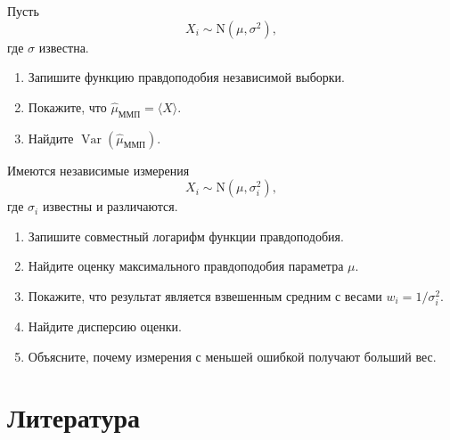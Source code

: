 \documentclass[
  russian,
  11pt,
  a4paper,
  open=any]{scrbook}
\providecommand{\tightlist}{%
  \setlength{\itemsep}{0pt}\setlength{\parskip}{0pt}}
\begin{document}
\begin{semanticpdfbox}[colback=BookCoralSoft,borderline west={1.2mm}{0pt}{BookCoral}]

\par\nopagebreak[4]\vspace{1.2mm}

Пусть \[
X_i\sim\mathrm N(\mu,\sigma^2),
\] где \(\sigma\) известна.

\begin{enumerate}
\def\labelenumi{\arabic{enumi}.}
\tightlist
\item
  Запишите функцию правдоподобия независимой выборки.
\item
  Покажите, что \(\widehat\mu_{\mathrm{ММП}}=\langle X\rangle\).
\item
  Найдите \(\operatorname{Var}(\widehat\mu_{\mathrm{ММП}})\).
\end{enumerate}

\end{semanticpdfbox}

\begin{semanticpdfbox}[colback=BookCoralSoft,borderline west={1.2mm}{0pt}{BookCoral}]

\par\nopagebreak[4]\vspace{1.2mm}

Имеются независимые измерения \[
X_i\sim\mathrm N(\mu,\sigma_i^2),
\] где \(\sigma_i\) известны и различаются.

\begin{enumerate}
\def\labelenumi{\arabic{enumi}.}
\tightlist
\item
  Запишите совместный логарифм функции правдоподобия.
\item
  Найдите оценку максимального правдоподобия параметра \(\mu\).
\item
  Покажите, что результат является взвешенным средним с весами
  \(w_i=1/\sigma_i^2\).
\item
  Найдите дисперсию оценки.
\item
  Объясните, почему измерения с меньшей ошибкой получают больший вес.
\end{enumerate}

\end{semanticpdfbox}

\section*{Литература}\label{ux43bux438ux442ux435ux440ux430ux442ux443ux440ux430-8}
\end{document}
